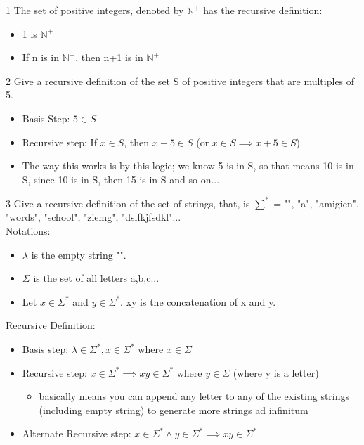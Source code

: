 \documentclass[12pt, letterpaper]{article}
\newcommand{\exheader}[1][ex]{{\tiny{#1}\normalsize}}
\begin{document}
\exheader[1] The set of positive integers, denoted by $\mathbb{N}^+$ has the recursive definition:
\begin{itemize}[leftmargin=*, label={}]
	\item 1 is $\mathbb{N}^+$
	\item If n is in $\mathbb{N}^+$, then n+1 is in $\mathbb{N}^+$
\end{itemize}

\bigbreak

\exheader[2] Give a recursive definition of the set S of positive integers that are multiples of 5.
\begin{itemize}[leftmargin=*, label={}]
	\item Basis Step: $5 \in S$
	\item Recursive step: If $x \in S$, then $x+5 \in S$ (or $x \in S \implies x + 5 \in S$)
	\item The way this works is by this logic; we know 5 is in S, so that means 10 is in S, since 10 is in S, then 15 is in S and so on...
\end{itemize}

\bigbreak

\exheader[3] Give a recursive definition of the set of strings, that, is $\sum^* = ${"", "a", "amigien", "words", "school", "ziemg", "dslfkjfsdkl"...} \\ 
Notations: 
\begin{itemize}[leftmargin=*, label={}]
	\item $\lambda$ is the empty string "".
	\item $\Sigma$ is the set of all letters {a,b,c...}
	\item Let $x \in \Sigma^*$ and $y \in \Sigma^*$. xy is the concatenation of x and y.
\end{itemize}
Recursive Definition:
\begin{itemize}[leftmargin=*, label={}]
	\item Basis step: $\lambda \in \Sigma^*, x \in \Sigma^*$ where $x \in \Sigma$
	\item Recursive step: $x \in \Sigma^* \implies xy \in \Sigma^*$ where $y \in \Sigma$ {\small (where y is a letter)}
	\begin{itemize}[label={}]
		\item basically means you can append any letter to any of the existing strings (including empty string) to generate more strings ad infinitum
	\end{itemize}
	\item Alternate Recursive step: $x \in \Sigma^* \land y \in \Sigma^* \implies xy \in \Sigma^*$
\end{itemize}
\bigbreak
\end{document}
